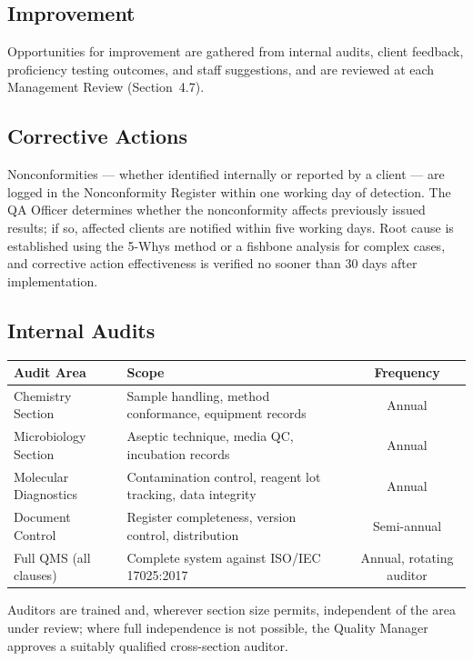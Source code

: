 \subsection{Improvement}

Opportunities for improvement are gathered from internal audits, client feedback,
proficiency testing outcomes, and staff suggestions, and are reviewed at each Management
Review (Section~4.7).

\subsection{Corrective Actions}

Nonconformities --- whether identified internally or reported by a client --- are logged in
the Nonconformity Register within one working day of detection. The QA Officer determines
whether the nonconformity affects previously issued results; if so, affected clients are
notified within five working days. Root cause is established using the 5-Whys method or a
fishbone analysis for complex cases, and corrective action effectiveness is verified no
sooner than 30 days after implementation.

\subsection{Internal Audits}

\begin{table}[h]
\centering
\small
\renewcommand{\arraystretch}{1.3}
\begin{tabularx}{\linewidth}{@{}l X c@{}}
\toprule
\textbf{Audit Area} & \textbf{Scope} & \textbf{Frequency} \\
\midrule
Chemistry Section & Sample handling, method conformance, equipment records & Annual \\
Microbiology Section & Aseptic technique, media QC, incubation records & Annual \\
Molecular Diagnostics & Contamination control, reagent lot tracking, data integrity & Annual \\
Document Control & Register completeness, version control, distribution & Semi-annual \\
Full QMS (all clauses) & Complete system against ISO/IEC 17025:2017 & Annual, rotating auditor \\
\bottomrule
\end{tabularx}
\end{table}

Auditors are trained and, wherever section size permits, independent of the area under
review; where full independence is not possible, the Quality Manager approves a suitably
qualified cross-section auditor.

